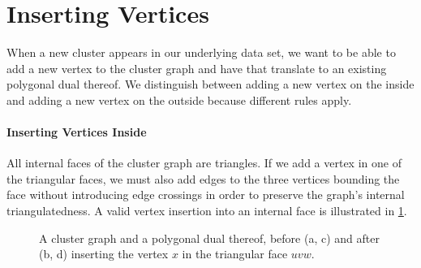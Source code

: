 \section{Inserting Vertices}
\label{sect:inserting-vertices}

When a new cluster appears in our underlying data set, we want to be able to add a new vertex to the cluster graph and have that translate to an existing polygonal dual thereof. We distinguish between adding a new vertex on the inside and adding a new vertex on the outside because different rules apply.



\paragraph{Inserting Vertices Inside}

All internal faces of the cluster graph are triangles. If we add a vertex in one of the triangular faces, we must also add edges to the three vertices bounding the face without introducing edge crossings in order to preserve the graph's internal triangulatedness. A valid vertex insertion into an internal face is illustrated in \cref{fig:insert-vertex-example-inside}.

\begin{figure}[H]
	\centering
	\quad
	\qquad
	\quad
	\caption{A cluster graph and a polygonal dual thereof, before (a, c) and after (b, d) inserting the vertex $x$ in the triangular face $uvw$.}
	\label{fig:insert-vertex-example-inside}
\end{figure}

